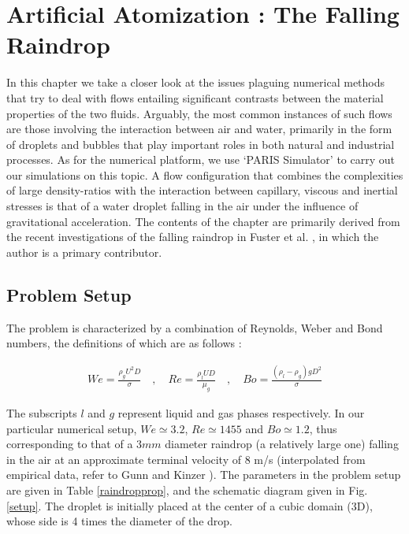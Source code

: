 \setchapterpreamble[u]{\margintoc}
\chapter{Artificial Atomization : The Falling Raindrop}

In this chapter we take a closer look at the issues 
plaguing numerical methods that try to deal with flows 
entailing significant contrasts between the material 
properties of the two fluids. Arguably, the most common
instances of such flows are those involving the interaction
between air and water, primarily in the form of droplets and 
bubbles that play important roles in both natural and industrial processes. 
As for the numerical platform, we use `PARIS Simulator' 
to carry out our simulations on this topic. 
A flow configuration that combines the complexities of large 
density-ratios with the interaction between capillary, viscous and 
inertial stresses is that of a water droplet falling in the 
air under the influence of gravitational acceleration.
The contents of the chapter are primarily derived 
from the recent investigations of the falling raindrop  
in Fuster et al. , in which
the author is a primary contributor. 
\section{Problem Setup}

The problem is characterized by a combination of Reynolds, 
Weber and Bond numbers, the definitions of which are as follows : 

\begin{align}
We=\frac{\rho_{g} U^2 D}{\sigma} \quad,\quad Re= \frac{\rho_{l} U D}{\mu_{g}} \quad,\quad Bo=\frac{\left(\rho_{l}-\rho_{g}\right) g D^2 }{\sigma}
\end{align}

The subscripts $l$ and $g$ represent liquid and gas phases respectively. 
In our particular numerical setup, $We \simeq 3.2 $, $Re \simeq 1455 $ and $Bo \simeq 1.2 $, 
thus corresponding to that of a $3mm$ diameter raindrop (a relatively large one) 
falling in the air at an approximate terminal velocity of  
$8$ m/s (interpolated from empirical data, refer to Gunn and Kinzer \cite{gunn1949}). 
The parameters in the problem setup are given in Table \ref{raindropprop}, 
and the schematic diagram given in Fig. \ref{setup}. 
The droplet is initially placed at the center of a cubic domain (3D), 
whose side is 4 times the diameter of the drop. 


